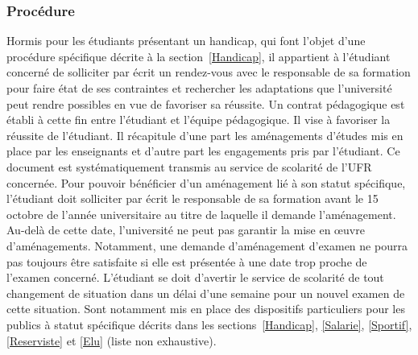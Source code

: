 \documentclass[a4paper,11pt]{article}
\begin{document}
\subsubsection{Procédure}
Hormis pour les étudiants présentant un handicap, qui font l'objet d'une procédure spécifique décrite à la section~\ref{Handicap}, il appartient à l'étudiant concerné de solliciter par écrit un rendez-vous avec le responsable de sa formation pour faire état de ses contraintes et rechercher les adaptations que l'université peut rendre possibles en vue de favoriser sa réussite. Un contrat pédagogique est établi à cette fin entre l'étudiant et l'équipe pédagogique. Il vise à favoriser la réussite de l'étudiant. Il récapitule d'une part les aménagements d'études mis en place par les enseignants et d'autre part les engagements pris par l'étudiant. Ce document est systématiquement transmis au service de scolarité de l'UFR concernée.
Pour pouvoir bénéficier d'un aménagement lié à son statut spécifique, l'étudiant doit solliciter par écrit le responsable de sa formation avant le 15 octobre de l'année universitaire au titre de laquelle il demande l'aménagement. Au-delà de cette date, l'université ne peut pas garantir la mise en \oe uvre d'aménagements. Notamment, une demande d'aménagement d'examen ne pourra pas toujours être satisfaite si elle est présentée à une date trop proche de l'examen concerné.
L'étudiant se doit d'avertir le service de scolarité de tout changement de situation dans un délai d'une semaine pour un nouvel examen de cette situation.
Sont notamment mis en place des dispositifs particuliers pour les publics à statut spécifique décrits dans les sections~\ref{Handicap}, \ref{Salarie}, \ref{Sportif}, \ref{Reserviste} et \ref{Elu} (liste non exhaustive).
\end{document}
